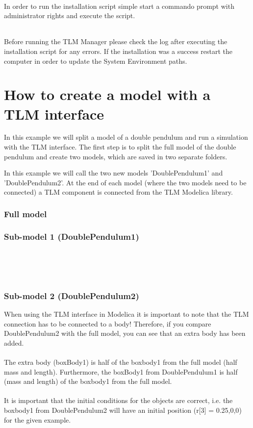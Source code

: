 ~\\In order to run the installation script simple start a commando prompt with administrator rights and execute the script.

~\\Before running the TLM Manager please check the log after executing the installation script for any errors. If the installation was a success restart the computer in order to update the System Environment paths.

\section{How to create a model with a TLM interface}
In this example we will split a model of a double pendulum and run a simulation with the TLM interface. The first step is to split the full model of the double pendulum and create two models, which are saved in two separate folders.

In this example we will call the two new models 'DoublePendulum1' and 'DoublePendulum2'. At the end of each model (where the two models need to be connected) a TLM component is connected from the TLM Modelica library.

\subsubsection{Full model}

\subsubsection{Sub-model 1 (DoublePendulum1)}

~\\\\\\
\subsubsection{Sub-model 2 (DoublePendulum2)}

When using the TLM interface in Modelica it is important to note that the TLM connection has to be connected to a body! Therefore, if you compare DoublePendulum2 with the full model, you can see that an extra body has been added. \\\\The extra body (boxBody1) is half of the boxbody1 from the full model (half mass and length). Furthermore, the boxBody1 from DoublePendulum1 is half (mass and length) of the boxbody1 from the full model.\\\\It is important that the initial conditions for the objects are correct, i.e. the boxbody1 from DoublePendulum2 will have an initial position (r[3] = {0.25,0,0})  for the given example.\\\\

